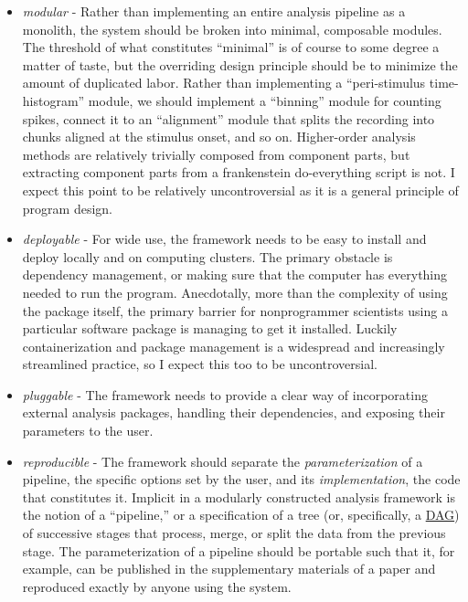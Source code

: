 \documentclass[11pt]{article}
\begin{document}
\begin{multicols}{2}
\begin{itemize}
\item
  \emph{modular} - Rather than implementing an entire analysis pipeline
  as a monolith, the system should be broken into minimal, composable
  modules. The threshold of what constitutes ``minimal'' is of course to
  some degree a matter of taste, but the overriding design principle
  should be to minimize the amount of duplicated labor. Rather than
  implementing a ``peri-stimulus time-histogram'' module, we should
  implement a ``binning'' module for counting spikes, connect it to an
  ``alignment'' module that splits the recording into chunks aligned at
  the stimulus onset, and so on. Higher-order analysis methods are
  relatively trivially composed from component parts, but extracting
  component parts from a frankenstein do-everything script is not. I
  expect this point to be relatively uncontroversial as it is a general
  principle of program design.
\item
  \emph{deployable} - For wide use, the framework needs to be easy to
  install and deploy locally and on computing clusters. The primary
  obstacle is dependency management, or making sure that the computer
  has everything needed to run the program. Anecdotally, more than the
  complexity of using the package itself, the primary barrier for
  nonprogrammer scientists using a particular software package is
  managing to get it installed. Luckily containerization and package
  management is a widespread and increasingly streamlined practice, so I
  expect this too to be uncontroversial.
\item
  \emph{pluggable} - The framework needs to provide a clear way of
  incorporating external analysis packages, handling their dependencies,
  and exposing their parameters to the user.
\item
  \emph{reproducible} - The framework should separate the
  \emph{parameterization} of a pipeline, the specific options set by the
  user, and its \emph{implementation}, the code that constitutes it.
  Implicit in a modularly constructed analysis framework is the notion
  of a ``pipeline,'' or a specification of a tree (or, specifically, a
  \href{https://en.wikipedia.org/wiki/Directed_acyclic_graph}{DAG}) of
  successive stages that process, merge, or split the data from the
  previous stage. The parameterization of a pipeline should be portable
  such that it, for example, can be published in the supplementary
  materials of a paper and reproduced exactly by anyone using the
  system.
\end{itemize}


\end{multicols}
\end{document}
